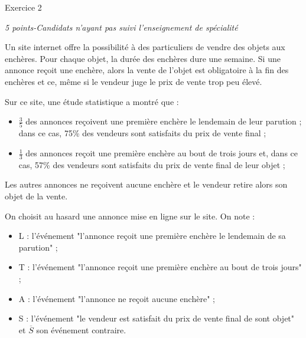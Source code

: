 
%
\begin{h2}Exercice 2\end{h2}
\textit{5 points-Candidats n'ayant pas suivi l'enseignement de spécialité}
\par
Un site internet offre la possibilité à des particuliers de vendre des objets aux enchères. Pour chaque objet, la durée des enchères dure une semaine. Si une annonce reçoit une enchère, alors la vente de l'objet est obligatoire à la fin des enchères et ce, même si le vendeur juge le prix de vente trop peu élevé.
\par
Sur ce site, une étude statistique a montré que :
\begin{itemize}
     \item
     $\frac{3}{5}$ des annonces reçoivent une première enchère le lendemain de leur parution ; dans ce cas, 75\% des vendeurs sont satisfaits du prix de vente final ;
     \item
     $\frac{1}{3}$ des annonces reçoit une première enchère au bout de trois jours et, dans ce cas, 57\% des vendeurs sont satisfaits du prix de vente final de leur objet ;
\end{itemize}
Les autres annonces ne reçoivent aucune enchère et le vendeur retire alors son objet de la vente.
\par
On choisit au hasard une annonce mise en ligne sur le site. On note :
\begin{itemize}
     \item
     L : l'événement "l'annonce reçoit une première enchère le lendemain de sa parution" ;
     \item
     T : l'événement "l'annonce reçoit une première enchère au bout de trois jours" ;
     \item
     A : l'événement "l'annonce ne reçoit aucune enchère" ;
     \item
     S : l'événement "le vendeur est satisfait du prix de vente final de sont objet" et $\overline{S}$ son événement contraire.
\end{itemize}
